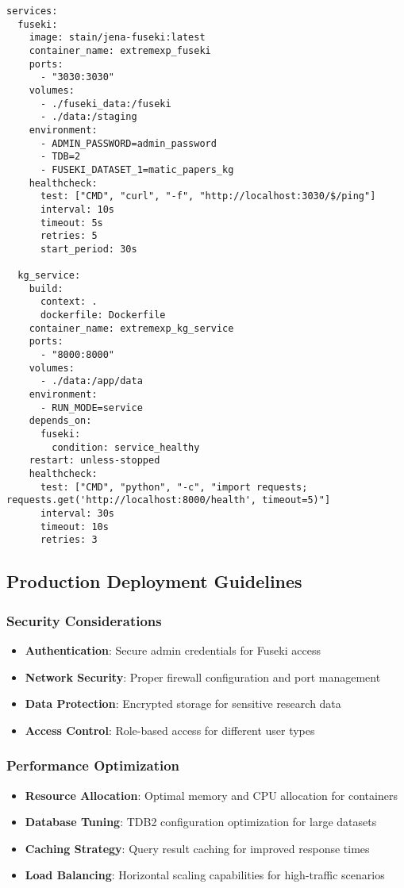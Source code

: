 \documentclass[12pt,a4paper]{article}
\begin{document}
\begin{lstlisting}[caption=Docker Compose Configuration]
services:
  fuseki:
    image: stain/jena-fuseki:latest
    container_name: extremexp_fuseki
    ports:
      - "3030:3030"
    volumes:
      - ./fuseki_data:/fuseki
      - ./data:/staging
    environment:
      - ADMIN_PASSWORD=admin_password
      - TDB=2
      - FUSEKI_DATASET_1=matic_papers_kg
    healthcheck:
      test: ["CMD", "curl", "-f", "http://localhost:3030/$/ping"]
      interval: 10s
      timeout: 5s
      retries: 5
      start_period: 30s

  kg_service:
    build:
      context: .
      dockerfile: Dockerfile
    container_name: extremexp_kg_service
    ports:
      - "8000:8000"
    volumes:
      - ./data:/app/data
    environment:
      - RUN_MODE=service
    depends_on:
      fuseki:
        condition: service_healthy
    restart: unless-stopped
    healthcheck:
      test: ["CMD", "python", "-c", "import requests; requests.get('http://localhost:8000/health', timeout=5)"]
      interval: 30s
      timeout: 10s
      retries: 3
\end{lstlisting}

\subsection{Production Deployment Guidelines}

\subsubsection{Security Considerations}

\begin{itemize}
    \item \textbf{Authentication}: Secure admin credentials for Fuseki access
    \item \textbf{Network Security}: Proper firewall configuration and port management
    \item \textbf{Data Protection}: Encrypted storage for sensitive research data
    \item \textbf{Access Control}: Role-based access for different user types
\end{itemize}

\subsubsection{Performance Optimization}

\begin{itemize}
    \item \textbf{Resource Allocation}: Optimal memory and CPU allocation for containers
    \item \textbf{Database Tuning}: TDB2 configuration optimization for large datasets
    \item \textbf{Caching Strategy}: Query result caching for improved response times
    \item \textbf{Load Balancing}: Horizontal scaling capabilities for high-traffic scenarios
\end{itemize}
\end{document}

